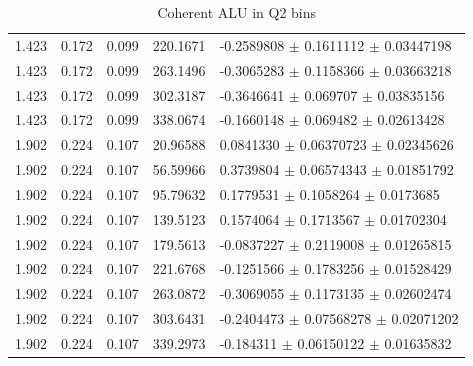 \begin{table}[!h]
\begin{center}
\begin{tabular}{||l|l|l|l|l||}
         1.423 & 0.172 & 0.099 &  220.1671   &   -0.2589808  $\pm$   0.1611112   $\pm$   0.03447198 \\
         1.423 & 0.172 & 0.099 &  263.1496   &   -0.3065283  $\pm$   0.1158366   $\pm$   0.03663218 \\
         1.423 & 0.172 & 0.099 &  302.3187   &   -0.3646641  $\pm$   0.069707    $\pm$   0.03835156 \\
         1.423 & 0.172 & 0.099 &  338.0674   &   -0.1660148  $\pm$   0.069482    $\pm$   0.02613428 \\
         \hline                                                                        
         1.902 & 0.224 & 0.107 &  20.96588   &    0.0841330  $\pm$   0.06370723  $\pm$   0.02345626 \\
         1.902 & 0.224 & 0.107 &  56.59966   &    0.3739804  $\pm$   0.06574343  $\pm$   0.01851792 \\
         1.902 & 0.224 & 0.107 &  95.79632   &    0.1779531  $\pm$   0.1058264   $\pm$   0.0173685  \\
         1.902 & 0.224 & 0.107 &  139.5123   &    0.1574064  $\pm$   0.1713567   $\pm$   0.01702304 \\
         1.902 & 0.224 & 0.107 &  179.5613   &   -0.0837227  $\pm$   0.2119008   $\pm$   0.01265815 \\
         1.902 & 0.224 & 0.107 &  221.6768   &   -0.1251566  $\pm$   0.1783256   $\pm$   0.01528429 \\
         1.902 & 0.224 & 0.107 &  263.0872   &   -0.3069055  $\pm$   0.1173135   $\pm$   0.02602474 \\
         1.902 & 0.224 & 0.107 &  303.6431   &   -0.2404473  $\pm$   0.07568278  $\pm$   0.02071202 \\
         1.902 & 0.224 & 0.107 &  339.2973   &   -0.184311   $\pm$   0.06150122  $\pm$   0.01635832 \\
      \hline 
      \hline
      \end{tabular}
      \caption{ Coherent ALU in Q2 bins}
      \label{table:Coh_Q2_BSA}
   \end{center}
\end{table}                    

